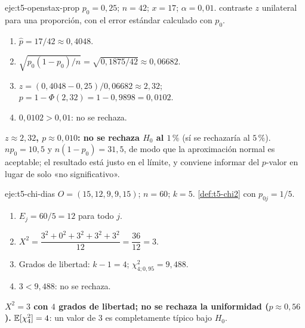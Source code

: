 \begin{solucion}{eje:t5-openstax-prop}
\datos $p_0=0{,}25$; $n=42$; $x=17$; $\alpha=0{,}01$.
\planteamiento contraste $z$ unilateral para una proporción, con el error estándar calculado con $p_0$.
\pasos
\begin{enumerate}[label=\arabic*.]
  \item $\widehat p=17/42\approx0{,}4048$.
  \item $\sqrt{p_0(1-p_0)/n}=\sqrt{0{,}1875/42}\approx0{,}06682$.
  \item $z=(0{,}4048-0{,}25)/0{,}06682\approx2{,}32$; $p=1-\Phi(2{,}32)=1-0{,}9898=0{,}0102$.
  \item $0{,}0102>0{,}01$: no se rechaza.
\end{enumerate}
\resultado \textbf{$z\approx2{,}32$, $p\approx0{,}010$: no se rechaza $H_0$ al $1\,\%$} (sí se rechazaría al $5\,\%$).
\comprobacion $np_0=10{,}5$ y $n(1-p_0)=31{,}5$, de modo que la aproximación normal es aceptable; el resultado está justo en el límite, y conviene informar del $p$-valor en lugar de solo «no significativo».
\end{solucion}

\begin{solucion}{eje:t5-chi-dias}
\datos $O=(15,12,9,9,15)$; $n=60$; $k=5$.
\planteamiento \cref{def:t5-chi2} con $p_{0j}=1/5$.
\pasos
\begin{enumerate}[label=\arabic*.]
  \item $E_j=60/5=12$ para todo $j$.
  \item $X^{2}=\dfrac{3^{2}+0^{2}+3^{2}+3^{2}+3^{2}}{12}=\dfrac{36}{12}=3$.
  \item Grados de libertad: $k-1=4$; $\chi^{2}_{4;0{,}95}=9{,}488$.
  \item $3<9{,}488$: no se rechaza.
\end{enumerate}
\resultado \textbf{$X^{2}=3$ con $4$ grados de libertad; no se rechaza la uniformidad ($p\approx0{,}56$).}
\comprobacion $\mathbb{E}[\chi^{2}_4]=4$: un valor de $3$ es completamente típico bajo $H_0$.
\end{solucion}

